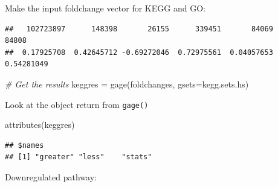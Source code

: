 \documentclass[
]{article}
\newenvironment{Shaded}{\begin{snugshade}}{\end{snugshade}}
\newcommand{\AttributeTok}[1]{\textcolor[rgb]{0.77,0.63,0.00}{#1}}
\newcommand{\CommentTok}[1]{\textcolor[rgb]{0.56,0.35,0.01}{\textit{#1}}}
\newcommand{\FunctionTok}[1]{\textcolor[rgb]{0.00,0.00,0.00}{#1}}
\newcommand{\NormalTok}[1]{#1}
\newcommand{\OtherTok}[1]{\textcolor[rgb]{0.56,0.35,0.01}{#1}}
\newcommand{\SpecialCharTok}[1]{\textcolor[rgb]{0.00,0.00,0.00}{#1}}
\begin{document}
Make the input foldchange vector for KEGG and GO:

\begin{Shaded}
\end{Shaded}

\begin{verbatim}
##   102723897      148398       26155      339451       84069       84808 
##  0.17925708  0.42645712 -0.69272046  0.72975561  0.04057653  0.54281049
\end{verbatim}

\begin{Shaded}
\begin{Highlighting}[]
\CommentTok{\# Get the results}
\NormalTok{keggres }\OtherTok{=} \FunctionTok{gage}\NormalTok{(foldchanges, }\AttributeTok{gsets=}\NormalTok{kegg.sets.hs)}
\end{Highlighting}
\end{Shaded}

Look at the object return from \texttt{gage()}

\begin{Shaded}
\begin{Highlighting}[]
\FunctionTok{attributes}\NormalTok{(keggres)}
\end{Highlighting}
\end{Shaded}

\begin{verbatim}
## $names
## [1] "greater" "less"    "stats"
\end{verbatim}

Downregulated pathway:

\begin{Shaded}
\end{Shaded}
\end{document}
